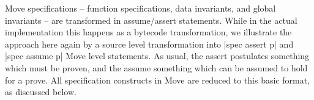 
Move specifications -- function specifications, data invariants, and global
invariants -- are transformed in assume/assert statements. While in the actual
implementation this happens as a bytecode transformation, we illustrate the
approach here again by a source level transformation into |spec assert p| and
|spec assume p| Move level statements. As usual, the assert postulates something
which must be proven, and the assume something which can be assumed to hold for
a prove. All specification constructs in Move are reduced to this basic format,
as discussed below.




